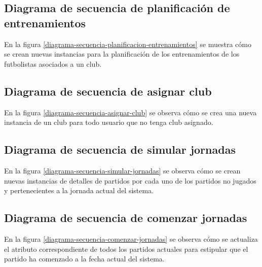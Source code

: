
\subsection*{Diagrama de secuencia de planificación de entrenamientos}
En la figura \ref{diagrama-secuencia-planificacion-entrenamientos} se muestra
cómo se crean nuevas instancias para la planificación de los entrenamientos de
los futbolistas asociados a un club.


\subsection*{Diagrama de secuencia de asignar club}
En la figura \ref{diagrama-secuencia-asignar-club} se observa cómo se crea una
nueva instancia de un club para todo usuario que no tenga club asignado.


\subsection*{Diagrama de secuencia de simular jornadas}
En la figura \ref{diagrama-secuencia-simular-jornadas} se observa cómo se crean
nuevas instancias de detalles de partidos por cada uno de los partidos no
jugados y pertenecientes a la jornada actual del sistema.


\subsection*{Diagrama de secuencia de comenzar jornadas}
En la figura \ref{diagrama-secuencia-comenzar-jornadas} se observa cómo se
actualiza el atributo correspondiente de todos los partidos actuales para
estipular que el partido ha comenzado a la fecha actual del sistema.
\newpage

